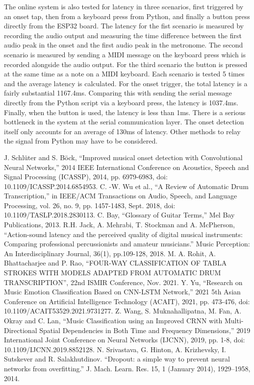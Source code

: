 \documentclass[conference]{IEEEtran}
\begin{document}
The online system is also tested for latency in three scenarios, first triggered by an onset tap, then from a keyboard press from Python, and finally a button press directly from the
ESP32 board. The latency for the fist scenario is measured by recording the audio output and measuring the time difference between the first audio peak in the onset and the first audio peak in the metronome. The second 
scenario is measured by sending a MIDI message on the keyboard press which is recorded alongside the audio output. For the third scenario the button is pressed at the same time as a note on a MIDI keyboard. 
Each scenario is tested 5 times and the average latency is calculated. For the onset trigger, the total latency is a fairly substantial 1167.4ms. Comparing this with sending
the serial message directly from the Python script via a keyboard press, the latency is 1037.4ms. Finally, when the button is used, the latency is less than 1ms.
There is a serious bottleneck in the system at the serial communication layer. The onset detection itself only accounts for an average of 130ms of latency. Other methods to relay the signal
from Python may have to be considered.


\begin{thebibliography}{00}
 J. Schlüter and S. Böck, ``Improved musical onset detection with Convolutional Neural Networks,'' 2014 IEEE International Conference on Acoustics, Speech and Signal Processing (ICASSP), 2014, pp. 6979-6983, doi: 10.1109/ICASSP.2014.6854953.
 C. -W. Wu et al., ``A Review of Automatic Drum Transcription,'' in IEEE/ACM Transactions on Audio, Speech, and Language Processing, vol. 26, no. 9, pp. 1457-1483, Sept. 2018, doi: 10.1109/TASLP.2018.2830113.
 C. Bay, ``Glossary of Guitar Terms,'' Mel Bay Publications, 2013.
 R.H. Jack, A. Mehrabi, T. Stockman and A. McPherson, ``Action-sound latency and the perceived quality of digital musical instruments: Comparing professional percussionists and amateur musicians.'' Music Perception: An Interdisciplinary Journal, 36(1), pp.109-128, 2018.
 M. A. Rohit, A. Bhattacharjee and P. Rao, ``FOUR-WAY CLASSIFICATION OF TABLA STROKES WITH MODELS ADAPTED FROM AUTOMATIC DRUM TRANSCRIPTION'', 22nd ISMIR Conference, Nov. 2021.
 Y. Yu, ``Research on Music Emotion Classification Based on CNN-LSTM Network,'' 2021 5th Asian Conference on Artificial Intelligence Technology (ACAIT), 2021, pp. 473-476, doi: 10.1109/ACAIT53529.2021.9731277.
 Z. Wang, S. Muknahallipatna, M. Fan, A. Okray and C. Lan, ``Music Classification using an Improved CRNN with Multi-Directional Spatial Dependencies in Both Time and Frequency Dimensions,'' 2019 International Joint Conference on Neural Networks (IJCNN), 2019, pp. 1-8, doi: 10.1109/IJCNN.2019.8852128.
 N. Srivastava, G. Hinton, A. Krizhevsky, I. Sutskever and R. Salakhutdinov. ``Dropout: a simple way to prevent neural networks from overfitting.'' J. Mach. Learn. Res. 15, 1 (January 2014), 1929–1958, 2014.

\end{thebibliography}
\vspace{12pt}
\end{document}
